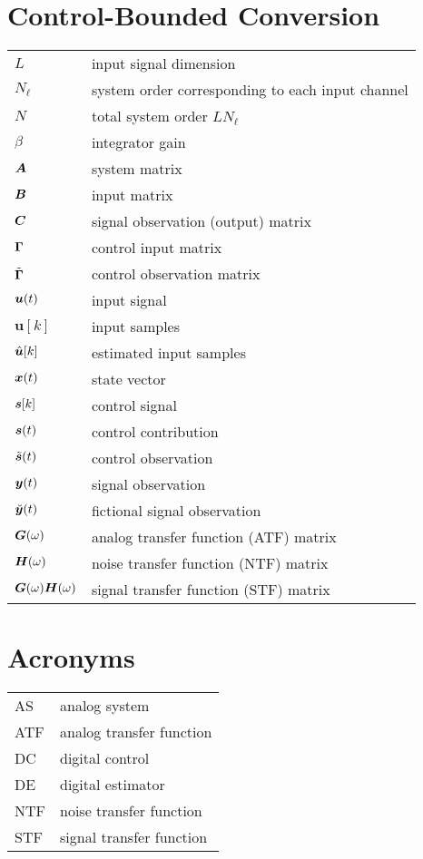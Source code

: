 \section*{Control-Bounded Conversion}
\begin{tabular}{ p{2cm} l }
    $L$         &  input signal dimension \\
    $N_\ell$    &  system order corresponding to each input channel \\
    $N$         &  total system order $L N_\ell$ \\
    $\beta$     &  integrator gain \\
    $\bm{A}$     &  system matrix \\
    $\bm{B}$     &  input matrix \\
    $\bm{C}$     &  signal observation (output) matrix \\
    $\bm{\Gamma}$     &  control input matrix \\
    $\tilde{\bm{\Gamma}}$&  control observation matrix \\
    $\bm{u}(t)$      &  input signal \\
    $\bm{u}[k]$ &  input samples \\
    $\hat{\bm{u}}[k]$   &  estimated input samples \\
    $\bm{x}(t)$      &  state vector \\
    $\bm{s}[k]$      &  control signal \\
    $\bm{s}(t)$      &  control contribution \\
    $\tilde{\bm{s}}(t)$ &  control observation \\
    $\bm{y}(t)$      &  signal observation \\
    $\breve{\bm{y}}(t)$ &  fictional signal observation \\
    $\bm{G}(\omega)$       &  analog transfer function (ATF) matrix \\
    $\bm{H}(\omega)$       &  noise transfer function (NTF) matrix \\
    $\bm{G}(\omega)\bm{H}(\omega)$    &  signal transfer function (STF) matrix \\


\end{tabular}

\section*{Acronyms}
\begin{tabular}{ p{2cm} l }
    AS         &  analog system \\
    ATF        &  analog transfer function \\
    DC         &  digital control \\
    DE         &  digital estimator \\
    NTF        &  noise transfer function \\
    STF        &  signal transfer function \\

\end{tabular}
